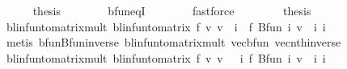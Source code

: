\begin{isabellebody}
\isanewline
\ \ \ \ \isamarkupfalse%
\ {\isacharquery}{\kern0pt}thesis\isanewline
\ \ \ \ \ \ \isamarkupfalse%
\ bfun{\isacharunderscore}{\kern0pt}eqI\isanewline
\ \ \ \ \ \ \isamarkupfalse%
\ fastforce\isanewline
\ \ \isamarkupfalse%
\isanewline
\ \ \isamarkupfalse%
\ \isamarkupfalse%
\ {\isacharquery}{\kern0pt}thesis\isacommand{{\isachardot}{\kern0pt}}\isamarkupfalse%
\isanewline
{}\isamarkupfalse%
%
\endisatagproof
{\isafoldproof}%
%
\isadelimproof
\isanewline
%
\endisadelimproof
\isanewline
{}\isamarkupfalse%
\ blinfun{\isacharunderscore}{\kern0pt}to{\isacharunderscore}{\kern0pt}matrix{\isacharunderscore}{\kern0pt}mult{\isacharprime}{\kern0pt}{\isacharcolon}{\kern0pt}\ {\isachardoublequoteopen}{\isacharparenleft}{\kern0pt}blinfun{\isacharunderscore}{\kern0pt}to{\isacharunderscore}{\kern0pt}matrix\ f\ {\isacharasterisk}{\kern0pt}v\ v{\isacharparenright}{\kern0pt}\ {\isachardollar}{\kern0pt}\ i\ {\isacharequal}{\kern0pt}\ f\ {\isacharparenleft}{\kern0pt}Bfun\ {\isacharparenleft}{\kern0pt}{\isasymlambda}i{\isachardot}{\kern0pt}\ v\ {\isachardollar}{\kern0pt}\ i{\isacharparenright}{\kern0pt}{\isacharparenright}{\kern0pt}\ i{\isachardoublequoteclose}\isanewline
%
\isadelimproof
\ \ %
\endisadelimproof
%
\isatagproof
{}\isamarkupfalse%
\ {\isacharparenleft}{\kern0pt}metis\ bfun{\isachardot}{\kern0pt}Bfun{\isacharunderscore}{\kern0pt}inverse\ blinfun{\isacharunderscore}{\kern0pt}to{\isacharunderscore}{\kern0pt}matrix{\isacharunderscore}{\kern0pt}mult\ vec{\isacharunderscore}{\kern0pt}bfun\ vec{\isacharunderscore}{\kern0pt}nth{\isacharunderscore}{\kern0pt}inverse{\isacharparenright}{\kern0pt}%
\endisatagproof
{\isafoldproof}%
%
\isadelimproof
\isanewline
%
\endisadelimproof
\isanewline
{}\isamarkupfalse%
\ blinfun{\isacharunderscore}{\kern0pt}to{\isacharunderscore}{\kern0pt}matrix{\isacharunderscore}{\kern0pt}mult{\isacharprime}{\kern0pt}{\isacharprime}{\kern0pt}{\isacharcolon}{\kern0pt}\ {\isachardoublequoteopen}{\isacharparenleft}{\kern0pt}blinfun{\isacharunderscore}{\kern0pt}to{\isacharunderscore}{\kern0pt}matrix\ f\ {\isacharasterisk}{\kern0pt}v\ v{\isacharparenright}{\kern0pt}\ {\isacharequal}{\kern0pt}\ {\isacharparenleft}{\kern0pt}{\isasymchi}\ i{\isachardot}{\kern0pt}\ f\ {\isacharparenleft}{\kern0pt}Bfun\ {\isacharparenleft}{\kern0pt}{\isasymlambda}i{\isachardot}{\kern0pt}\ v\ {\isachardollar}{\kern0pt}\ i{\isacharparenright}{\kern0pt}{\isacharparenright}{\kern0pt}\ i{\isacharparenright}{\kern0pt}{\isachardoublequoteclose}\isanewline

\end{isabellebody}
